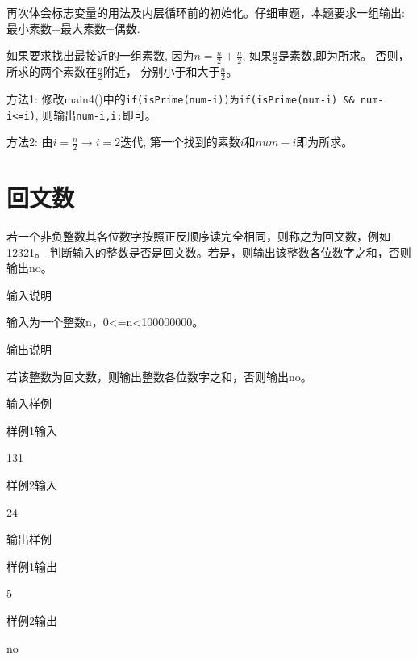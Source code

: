 \begin{note}[要点]
	再次体会标志变量的用法及内层循环前的初始化。仔细审题，本题要求一组输出: 最小素数+最大素数=偶数.
	
	如果要求找出最接近的一组素数, 因为$n=\frac{n}{2}+\frac{n}{2}$, 如果$\frac{n}{2}$是素数,即为所求。 否则，所求的两个素数在$\frac{n}{2}$附近， 分别小于和大于$\frac{n}{2}$。
	
	方法1: 修改main4()中的\lstinline|if(isPrime(num-i))为if(isPrime(num-i) && num-i<=i)|, 则输出\lstinline|num-i,i;|即可。 
	
	方法2: 由$i=\frac{n}{2}\to i=2$迭代, 第一个找到的素数$i$和$num-i$即为所求。
\end{note}

\section{回文数}
若一个非负整数其各位数字按照正反顺序读完全相同，则称之为回文数，例如12321。
判断输入的整数是否是回文数。若是，则输出该整数各位数字之和，否则输出no。

输入说明	

输入为一个整数n，0<=n<100000000。

输出说明	

若该整数为回文数，则输出整数各位数字之和，否则输出no。

输入样例
	
样例1输入

131

样例2输入

24

输出样例

样例1输出
	
5

样例2输出

no

